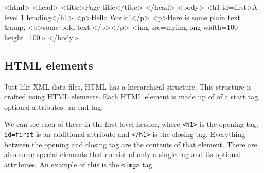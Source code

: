 \documentclass[
  letterpaper,
  DIV=11,
  numbers=noendperiod]{scrreprt}
\newenvironment{Shaded}{\begin{snugshade}}{\end{snugshade}}
\newcommand{\DataTypeTok}[1]{\textcolor[rgb]{0.68,0.00,0.00}{#1}}
\newcommand{\DecValTok}[1]{\textcolor[rgb]{0.68,0.00,0.00}{#1}}
\newcommand{\KeywordTok}[1]{\textcolor[rgb]{0.00,0.23,0.31}{#1}}
\newcommand{\NormalTok}[1]{\textcolor[rgb]{0.00,0.23,0.31}{#1}}
\newcommand{\OperatorTok}[1]{\textcolor[rgb]{0.37,0.37,0.37}{#1}}
\newcommand{\OtherTok}[1]{\textcolor[rgb]{0.00,0.23,0.31}{#1}}
\newcommand{\StringTok}[1]{\textcolor[rgb]{0.13,0.47,0.30}{#1}}
\begin{document}
\begin{Shaded}
\begin{Highlighting}[]
\DataTypeTok{\textless{}}\KeywordTok{html}\DataTypeTok{\textgreater{}}
\DataTypeTok{\textless{}}\KeywordTok{head}\DataTypeTok{\textgreater{}}
  \DataTypeTok{\textless{}}\KeywordTok{title}\DataTypeTok{\textgreater{}}\NormalTok{Page title}\DataTypeTok{\textless{}/}\KeywordTok{title}\DataTypeTok{\textgreater{}}
\DataTypeTok{\textless{}/}\KeywordTok{head}\DataTypeTok{\textgreater{}}
\DataTypeTok{\textless{}}\KeywordTok{body}\DataTypeTok{\textgreater{}}
  \DataTypeTok{\textless{}}\KeywordTok{h1}\OtherTok{ id}\OperatorTok{=}\StringTok{\textquotesingle{}first\textquotesingle{}}\DataTypeTok{\textgreater{}}\NormalTok{A level 1 heading}\DataTypeTok{\textless{}/}\KeywordTok{h1}\DataTypeTok{\textgreater{}}
  \DataTypeTok{\textless{}}\KeywordTok{p}\DataTypeTok{\textgreater{}}\NormalTok{Hello World!}\DataTypeTok{\textless{}/}\KeywordTok{p}\DataTypeTok{\textgreater{}}
  \DataTypeTok{\textless{}}\KeywordTok{p}\DataTypeTok{\textgreater{}}\NormalTok{Here is some plain text }\DecValTok{\&amp;} \DataTypeTok{\textless{}}\KeywordTok{b}\DataTypeTok{\textgreater{}}\NormalTok{some bold text.}\DataTypeTok{\textless{}/}\KeywordTok{b}\DataTypeTok{\textgreater{}\textless{}/}\KeywordTok{p}\DataTypeTok{\textgreater{}}
  \DataTypeTok{\textless{}}\KeywordTok{img}\OtherTok{ src}\OperatorTok{=}\StringTok{\textquotesingle{}myimg.png\textquotesingle{}}\OtherTok{ width}\OperatorTok{=}\StringTok{\textquotesingle{}100\textquotesingle{}}\OtherTok{ height}\OperatorTok{=}\StringTok{\textquotesingle{}100\textquotesingle{}}\DataTypeTok{\textgreater{}}
\DataTypeTok{\textless{}/}\KeywordTok{body}\DataTypeTok{\textgreater{}}
\end{Highlighting}
\end{Shaded}

\subsection{HTML elements}\label{html-elements}

Just like XML data files, HTML has a hierarchical structure. This
structure is crafted using HTML elements. Each HTML element is made up
of of a start tag, optional attributes, an end tag.

We can see each of these in the first level header, where
\texttt{\textless{}h1\textgreater{}} is the opening tag,
\texttt{id=\textquotesingle{}first\textquotesingle{}} is an additional
attribute and \texttt{\textless{}/h1\textgreater{}} is the closing tag.
Everything between the opening and closing tag are the contents of that
element. There are also some special elements that consist of only a
single tag and its optional attributes. An example of this is the
\texttt{\textless{}img\textgreater{}} tag.
\end{document}
